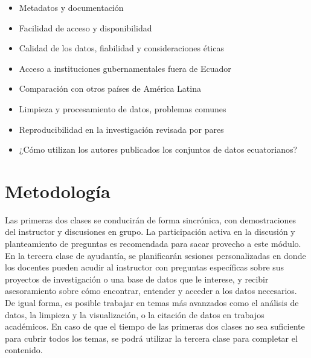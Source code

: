 \documentclass[
  letterpaper,
  DIV=11,
  numbers=noendperiod]{scrartcl}
\providecommand{\tightlist}{%
  \setlength{\itemsep}{0pt}\setlength{\parskip}{0pt}}\usepackage{longtable,booktabs,array}
\begin{document}
\begin{itemize}
  \begin{itemize}
  \tightlist
  \item
    Metadatos y documentación
  \item
    Facilidad de acceso y disponibilidad
  \item
    Calidad de los datos, fiabilidad y consideraciones éticas
  \item
    Acceso a instituciones gubernamentales fuera de Ecuador
  \item
    Comparación con otros países de América Latina
  \item
    Limpieza y procesamiento de datos, problemas comunes
  \item
    Reproducibilidad en la investigación revisada por pares
  \item
    ¿Cómo utilizan los autores publicados los conjuntos de datos
    ecuatorianos?
  \end{itemize}
\end{itemize}

\section{Metodología}\label{metodologuxeda}

Las primeras dos clases se conducirán de forma sincrónica, con
demostraciones del instructor y discusiones en grupo. La participación
activa en la discusión y planteamiento de preguntas es recomendada para
sacar provecho a este módulo. En la tercera clase de ayudantía, se
planificarán sesiones personalizadas en donde los docentes pueden acudir
al instructor con preguntas específicas sobre sus proyectos de
investigación o una base de datos que le interese, y recibir
asesoramiento sobre cómo encontrar, entender y acceder a los datos
necesarios. De igual forma, es posible trabajar en temas más avanzados
como el análisis de datos, la limpieza y la visualización, o la citación
de datos en trabajos académicos. En caso de que el tiempo de las
primeras dos clases no sea suficiente para cubrir todos los temas, se
podrá utilizar la tercera clase para completar el contenido.
\end{document}
